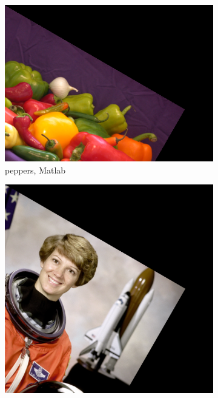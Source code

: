\documentclass{article}
\begin{document}
\begin{figure}[!ht]
    \centering
    \begin{subfigure}{0.356\textwidth}
        \includegraphics[width=\textwidth]{./fig/rotation_peppers.png}
        \caption{peppers, Matlab}
    \end{subfigure}
    \begin{subfigure}{0.267\textwidth}
        \includegraphics[width=\textwidth]{./fig/rotation_astronaut.png}

\end{subfigure}
\end{figure}
\end{document}
